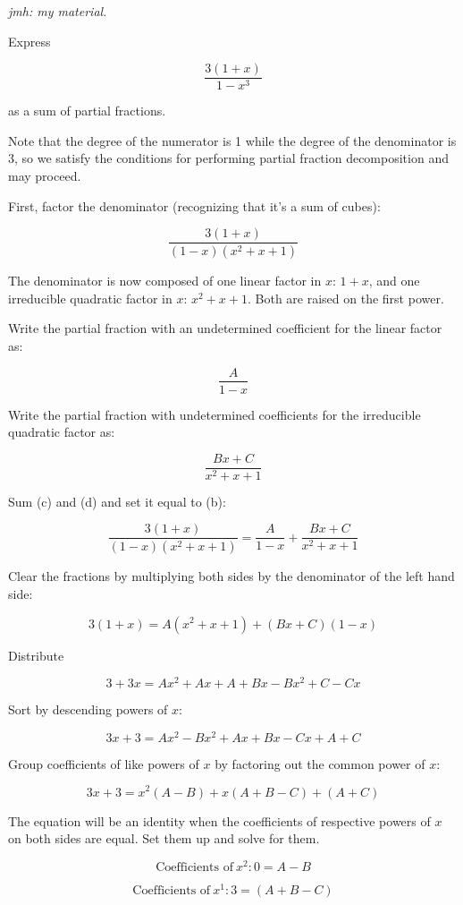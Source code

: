\documentclass{article}
\begin{document}
\emph{jmh: my material}.

Express

\[ \tag{a} \frac{3(1+x)}{1-x^3} \]

as a sum of partial fractions.

Note that the degree of the numerator is 1 while the degree of the denominator is 3, so we satisfy the conditions for performing partial fraction decomposition and may proceed.

First, factor the denominator (recognizing that it's a sum of cubes):

\[ \tag{b} \frac{3(1+x)}{(1-x)(x^2+x+1)} \]

The denominator is now composed of one linear factor in $x$: $1+x$, and one irreducible quadratic factor in $x$:  $x^2+x+1$. Both are raised on the first power.

Write the partial fraction with an undetermined coefficient for the linear factor as:

\[ \tag{c} \frac{A}{1-x} \]

Write the partial fraction with undetermined coefficients for the irreducible quadratic factor as:

\[ \tag{d} \frac{Bx + C}{x^2+x+1} \]

Sum (c) and (d) and set it equal to (b):

\[ \tag{e} \frac{3(1+x)}{(1-x)(x^2+x+1)} = \frac{A}{1-x} + \frac{Bx + C}{x^2+x+1} \]

Clear the fractions by multiplying both sides by the denominator of the left hand side:

\[ \tag{f} 3(1+x) = A(x^2+x+1) + (Bx+C)(1-x) \]

Distribute

\[ \tag{g} 3 + 3x = Ax^2 + Ax + A + Bx - Bx^2 +C - Cx \]

Sort by descending powers of $x$:

\[ \tag{h} 3x + 3 = Ax^2 - Bx^2 + Ax + Bx - Cx + A + C \]

Group coefficients of like powers of $x$ by factoring out the common power of $x$:

\[ \tag{i} 3x + 3 = x^2(A-B) + x(A+B-C) + (A+C) \]

The equation will be an identity when the coefficients of respective powers of $x$ on both sides are equal. Set them up and solve for them.

\[ \tag{j} \text{Coefficients of}~x^2: 0 = A - B \]

\[ \text{Coefficients of}~x^1: 3 = (A+B-C) \]
\end{document}
